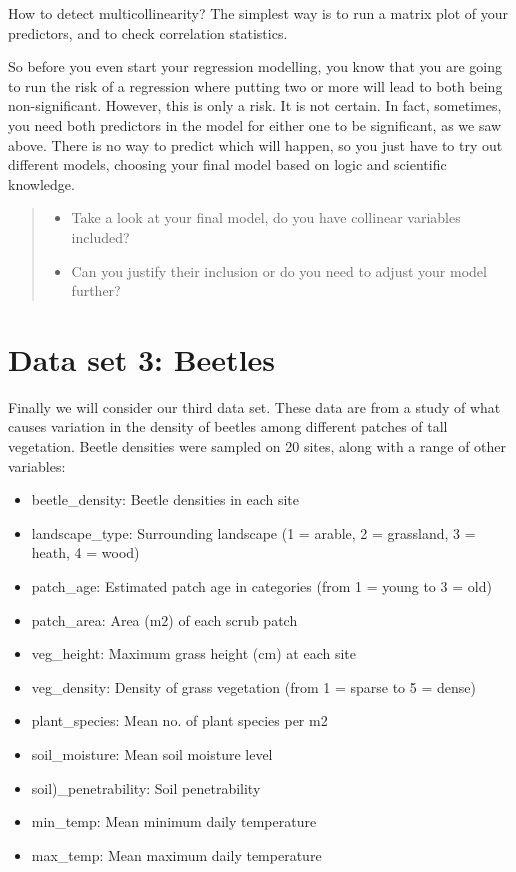 \documentclass[
]{book}
\providecommand{\tightlist}{%
  \setlength{\itemsep}{0pt}\setlength{\parskip}{0pt}}
\begin{document}
How to detect multicollinearity? The simplest way is to run a matrix plot of your predictors, and to check correlation statistics.

So before you even start your regression modelling, you know that you are going to run the risk of a regression where putting two or more will lead to both being non-significant. However, this is only a risk. It is not certain. In fact, sometimes, you need both predictors in the model for either one to be significant, as we saw above. There is no way to predict which will happen, so you just have to try out different models, choosing your final model based on logic and scientific knowledge.

\begin{quote}
\begin{itemize}
\tightlist
\item
  Take a look at your final model, do you have collinear variables included?
\item
  Can you justify their inclusion or do you need to adjust your model further?
\end{itemize}
\end{quote}

\hypertarget{data-set-3-beetles}{%
\section{Data set 3: Beetles}\label{data-set-3-beetles}}

Finally we will consider our third data set. These data are from a study of what causes variation in the density of beetles among different patches of tall vegetation. Beetle densities were sampled on 20 sites, along with a range of other variables:

\begin{itemize}
\tightlist
\item
  beetle\_density: Beetle densities in each site
\item
  landscape\_type: Surrounding landscape (1 = arable, 2 = grassland, 3 = heath, 4 = wood)
\item
  patch\_age: Estimated patch age in categories (from 1 = young to 3 = old)
\item
  patch\_area: Area (m2) of each scrub patch
\item
  veg\_height: Maximum grass height (cm) at each site
\item
  veg\_density: Density of grass vegetation (from 1 = sparse to 5 = dense)
\item
  plant\_species: Mean no. of plant species per m2
\item
  soil\_moisture: Mean soil moisture level
\item
  soil)\_penetrability: Soil penetrability
\item
  min\_temp: Mean minimum daily temperature
\item
  max\_temp: Mean maximum daily temperature
\end{itemize}
\end{document}
